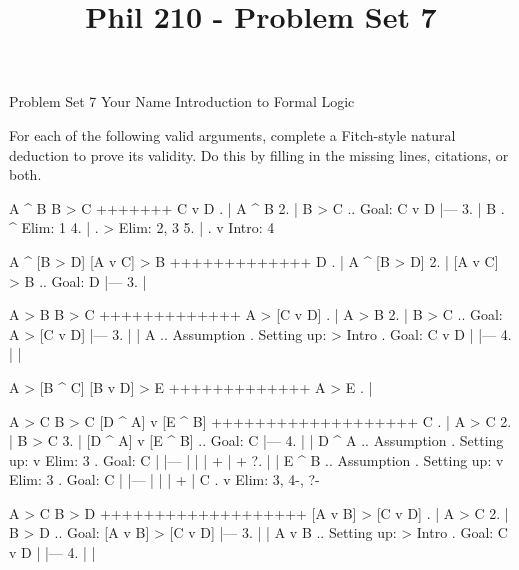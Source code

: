 
\title{Phil 210 - Problem Set 7}

\heading
Problem Set 7
Your Name
Introduction to Formal Logic
\endheading

For each of the following valid arguments, complete a Fitch-style natural deduction to prove its validity. Do this by filling in the missing lines, citations, or both.

\problems
{}
\argument
 A ^ B
 B > C
+++++++
 C v D
\endargument
        \answer
        . | A ^ B
         2. | B > C  ..  Goal: C v D
            |---
         3. | B      .  ^ Elim: 1
         4. |        .  > Elim: 2, 3
         5. |        .  v Intro: 4
        \endfitchproof
        \endanswer

\argument
 A ^ [B > D]
 [A v C] > B
+++++++++++++
 D
\endargument
        \answer
        . | A ^ [B > D]
         2. | [A v C] > B  ..  Goal: D
            |---
         3. | 
        \endfitchproof
        \endanswer

\argument
 A > B
 B > C
+++++++++++++
 A > [C v D]
\endargument
        \answer
        . | A > B
         2. | B > C        ..  Goal: A > [C v D]
            |---
         3. |   | A        ..  Assumption  .  Setting up: > Intro  .  Goal: C v D
            |   |---
         4. |   | 
        \endfitchproof
        \endanswer

\argument
 A > [B ^ C]
 [B v D] > E
+++++++++++++
 A > E
\endargument
        \answer
        . | 
        \endfitchproof
        \endanswer

\widerfitchsetup %
\argument
 A > C
 B > C
 [D ^ A] v [E ^ B]
+++++++++++++++++++
 C
\endargument
        \answer
        . | A > C
         2. | B > C
         3. | [D ^ A] v [E ^ B]  ..  Goal: C
            |---
         4. |   | D ^ A  ..  Assumption  .  Setting up: v Elim: 3  .  Goal: C
            |   |---
            |   | 
            |   +
            |   +
         ?. |   | E ^ B  ..  Assumption  .  Setting up: v Elim: 3  .  Goal: C
            |   |---
            |   | 
            |   +
            | C          .  v Elim: 3, 4-, ?-
        \endfitchproof
        \endanswer

\argument
 A > C
 B > D
+++++++++++++++++++
 [A v B] > [C v D]
\endargument
        \answer
        . | A > C
         2. | B > D          ..  Goal: [A v B] > [C v D]
            |---
         3. |   | A v B      ..  Setting up: > Intro    .  Goal: C v D
            |   |---
         4. |   | 
        \endfitchproof
        \endanswer

